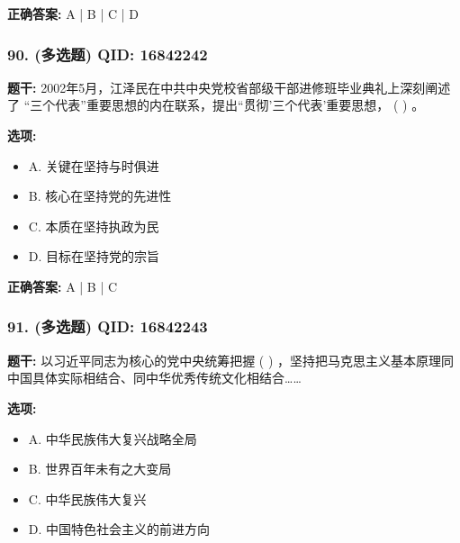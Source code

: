 \documentclass[12pt,UTF8]{ctexart}
\begin{document}
\textbf{正确答案:}
A | B | C | D

\vspace{0.3em}\hrulefill\vspace{0.7em}

\subsubsection*{90. (多选题) \small QID: 16842242}

\textbf{题干:}
2002年5月，江泽民在中共中央党校省部级干部进修班毕业典礼上深刻阐述了 “三个代表”重要思想的内在联系，提出“贯彻’三个代表’重要思想， ( ) 。

\textbf{选项:}
\begin{itemize}[leftmargin=*]

  \item A. 关键在坚持与时俱进

  \item B. 核心在坚持党的先进性

  \item C. 本质在坚持执政为民

  \item D. 目标在坚持党的宗旨

\end{itemize}

\textbf{正确答案:}
A | B | C

\vspace{0.3em}\hrulefill\vspace{0.7em}

\subsubsection*{91. (多选题) \small QID: 16842243}

\textbf{题干:}
以习近平同志为核心的党中央统筹把握 ( ) ，坚持把马克思主义基本原理同中国具体实际相结合、同中华优秀传统文化相结合……

\textbf{选项:}
\begin{itemize}[leftmargin=*]

  \item A. 中华民族伟大复兴战略全局

  \item B. 世界百年未有之大变局

  \item C. 中华民族伟大复兴

  \item D. 中国特色社会主义的前进方向

\end{itemize}
\end{document}
